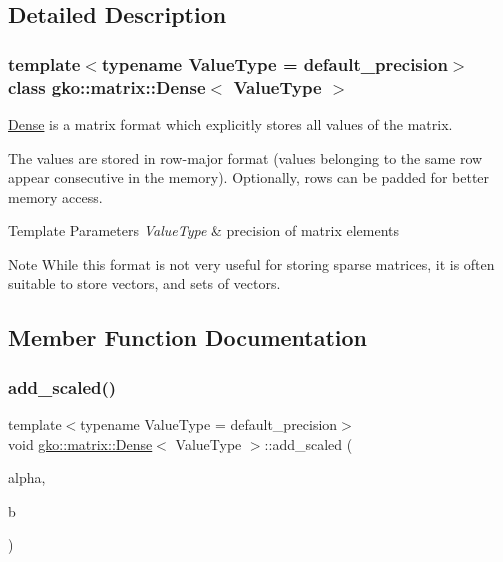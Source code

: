 \subsection{Detailed Description}
\subsubsection*{template$<$typename Value\+Type = default\+\_\+precision$>$\newline
class gko\+::matrix\+::\+Dense$<$ Value\+Type $>$}

\hyperlink{classgko_1_1matrix_1_1Dense}{Dense} is a matrix format which explicitly stores all values of the matrix. 

The values are stored in row-\/major format (values belonging to the same row appear consecutive in the memory). Optionally, rows can be padded for better memory access.


\begin{DoxyTemplParams}{Template Parameters}
{\em Value\+Type} & precision of matrix elements\\
\hline
\end{DoxyTemplParams}
\begin{DoxyNote}{Note}
While this format is not very useful for storing sparse matrices, it is often suitable to store vectors, and sets of vectors. 
\end{DoxyNote}


\subsection{Member Function Documentation}
\mbox{\label{classgko_1_1matrix_1_1Dense_ae6c4c15972b76bf7d8f6d50a96abda8d}} 
\subsubsection{\texorpdfstring{add\+\_\+scaled()}{add\_scaled()}}
{\footnotesize\ttfamily template$<$typename Value\+Type = default\+\_\+precision$>$ \\
void \hyperlink{classgko_1_1matrix_1_1Dense}{gko\+::matrix\+::\+Dense}$<$ Value\+Type $>$\+::add\+\_\+scaled (\begin{DoxyParamCaption}\item[{const \hyperlink{classgko_1_1LinOp}{Lin\+Op} $\ast$}]{alpha,  }\item[{const \hyperlink{classgko_1_1LinOp}{Lin\+Op} $\ast$}]{b }\end{DoxyParamCaption})\hspace{0.3cm}{\ttfamily [inline]}}



